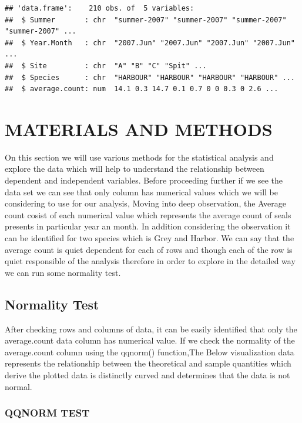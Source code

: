 \documentclass[
]{article}
\begin{document}
\begin{verbatim}
## 'data.frame':    210 obs. of  5 variables:
##  $ Summer       : chr  "summer-2007" "summer-2007" "summer-2007" "summer-2007" ...
##  $ Year.Month   : chr  "2007.Jun" "2007.Jun" "2007.Jun" "2007.Jun" ...
##  $ Site         : chr  "A" "B" "C" "Spit" ...
##  $ Species      : chr  "HARBOUR" "HARBOUR" "HARBOUR" "HARBOUR" ...
##  $ average.count: num  14.1 0.3 14.7 0.1 0.7 0 0 0.3 0 2.6 ...
\end{verbatim}

\hypertarget{materials-and-methods}{%
\section{MATERIALS AND METHODS}\label{materials-and-methods}}

On this section we will use various methods for the statistical analysis
and explore the data which will help to understand the relationship
between dependent and independent variables. Before proceeding further
if we see the data set we can see that only column has numerical values
which we will be considering to use for our analysis, Moving into deep
observation, the Average count cosist of each numerical value which
represents the average count of seals presents in particular year an
month. In addition considering the observation it can be identified for
two species which is Grey and Harbor. We can say that the average count
is quiet dependent for each of rows and though each of the row is quiet
responsible of the analysis therefore in order to explore in the
detailed way we can run some normality test.

\hypertarget{normality-test}{%
\subsection{Normality Test}\label{normality-test}}

After checking rows and columns of data, it can be easily identified
that only the average.count data column has numerical value. If we check
the normality of the average.count column using the qqnorm()
function,The Below visualization data represents the relationship
between the theoretical and sample quantities which derive the plotted
data is distinctly curved and determines that the data is not normal.

\hypertarget{qqnorm-test}{%
\subsubsection{QQNORM TEST}\label{qqnorm-test}}
\end{document}
